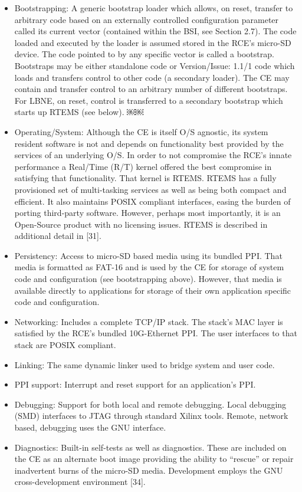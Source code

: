\begin{itemize}
\item Bootstrapping: A generic bootstrap loader which allows, on reset, transfer to arbitrary code based on an externally controlled configuration parameter called its current vector (contained within the BSI, see Section 2.7). The code loaded and executed by the loader is assumed stored in the RCE's micro-SD device. The code pointed to by any specific vector is called a bootstrap. Bootstraps may be either standalone code or Version/Issue: 1.1/1
code which loads and transfers control to other code (a secondary loader). The CE may contain and transfer control to an arbitrary number of different bootstraps. For LBNE, on reset, control is transferred to a secondary bootstrap which starts up RTEMS (see below).
￼￼\item Operating/System: Although the CE is itself O/S agnostic, its system resident software is not and depends on functionality best provided by the services of an underlying O/S. In order to not compromise the RCE's innate performance a Real/Time (R/T) kernel offered the best compromise in satisfying that functionality. That kernel is RTEMS. RTEMS has a fully provisioned set of multi-tasking services as well as being both compact and efficient. It also maintains POSIX compliant interfaces, easing the burden of porting third-party software. However, perhaps most importantly, it is an Open-Source product with no licensing issues. RTEMS is described in additional detail in [31].
\item Persistency:
Access to micro-SD based media using its bundled PPI. That media is formatted as FAT-16 and is used by the CE for storage of system code and configuration (see bootstrapping above). However, that media is available directly to applications for storage of their own application specific code and configuration.
\item Networking: Includes a complete TCP/IP stack. The stack's MAC layer is satisfied by the RCE's bundled 10G-Ethernet PPI. The user interfaces to that stack are POSIX compliant.
\item Linking: The same dynamic linker used to bridge system and user code.
\item PPI support: Interrupt and reset support for an application's PPI.
\item Debugging: Support for both local and remote debugging. Local debugging (SMD) interfaces to JTAG through standard Xilinx tools. Remote, network based, debugging uses the GNU interface.
\item Diagnostics: Built-in self-tests as well as diagnostics. These are included on the CE as an alternate boot image providing the ability to “rescue” or repair inadvertent burns of the micro-SD media.  Development employs the GNU cross-development environment [34].
\end{itemize}

